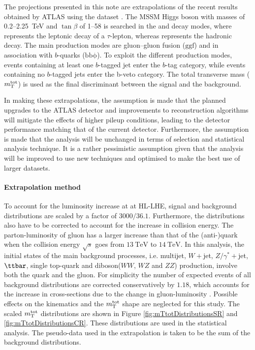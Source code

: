 The projections presented in this note are extrapolations of the recent results obtained by ATLAS
using the \RunTwo dataset \cite{ATLASRun2Ditau}.  The MSSM Higgs boson with masses of 
0.2--\SI{2.25}{\TeV} and $\tan\beta$ of 1--58 is searched in the \lephad and \hadhad decay modes, 
where \taulep represents the leptonic decay of a $\tau$-lepton, whereas \tauhad represents 
the hadronic decay. The main production modes are gluon--gluon fusion ($\mathrm{ggf}$) and in association 
with $b$-quarks ($\mathrm{bb\phi}$).  
To exploit the different production modes, events containing at least one $b$-tagged jet enter 
the $b$-tag category, while events containing no $b$-tagged jets enter the b-veto category.
The total transverse mass ($m_\textnormal{T}^\textnormal{tot}$) is used as the final discriminant between the signal and the background. 

In making these extrapolations, the assumption is made that the planned upgrades to the ATLAS detector 
and improvements to reconstruction algorithms will mitigate the effects of higher pileup conditions, 
leading to the detector performance matching that of the current detector. Furthermore, the assumption 
is made that the analysis will be unchanged in terms of selection and statistical analysis technique. 
It is a rather pessimistic assumption given that the analysis will be improved to use new techniques 
and optimised to make the best use of larger datasets.

\paragraph{Extrapolation method}
\label{sec:extrapolation method}
To account for the luminosity increase at at HL-LHE, signal and background distributions are scaled 
by a factor of $3000/36.1$.
Furthermore, the distributions also have to be corrected to account for the increase in collision energy. 
The parton-luminosity of gluon has a larger increase than that of the (anti-)quark when the collision energy 
$\sqrt{s}$ goes from $\SI{13}{\TeV}$ to $\SI{14}{\TeV}$.
In this analysis, the initial states of the main background processes, i.e. multijet, $W+$jet, $Z/\gamma^{*}+$jet, $\ttbar$, 
single top-quark and diboson($WW$, $WZ$ and $ZZ$) production, involve both the quark and the gluon. 
For simplicity the number of expected events of all background distributions are corrected conservatively by $1.18$, 
which accounts for the increase in cross-sections due to the change in gluon-luminosity \cite{Heinemeyer:2013tqa}. 
Possible effects on the kinematics and the $m_\textnormal{T}^\textnormal{tot}$ shape are neglected for this study. The scaled $m_\textnormal{T}^\textnormal{tot}$ 
distributions are shown in Figure \ref{fig:mTtotDistributionsSR} and \ref{fig:mTtotDistributionsCR}. 
These distributions are used in the statistical analysis. The pseudo-data used in the extrapolation is 
taken to be the sum of the background distributions.

